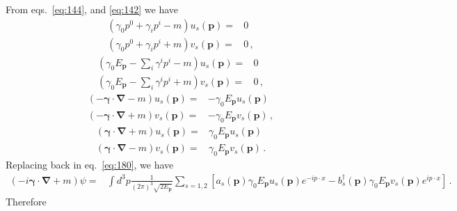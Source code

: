 From eqs.~\eqref{eq:144}, and \eqref{eq:142} we have
\begin{align}
  \left(\gamma_0 p^0+\gamma_i p^i-m\right)u_s(\mathbf{p})=&0\nonumber\\
  \left(\gamma_0 p^0+\gamma_i p^i+m\right)v_s(\mathbf{p})=&0\,,
\end{align}
\begin{align}
  \left(\gamma_0 E_{\mathbf{p}}-\sum_i\gamma^i p^i-m\right)u_s(\mathbf{p})=&0\nonumber\\
  \left(\gamma_0 E_{\mathbf{p}}-\sum_i\gamma^i p^i+m\right)v_s(\mathbf{p})=&0\,,
\end{align}
\begin{align}
  \left(-\boldsymbol{\gamma}\cdot\boldsymbol{\nabla}-m\right)u_s(\mathbf{p})=&-\gamma_0 E_{\mathbf{p}}u_s(\mathbf{p})\nonumber\\
  \left(-\boldsymbol{\gamma}\cdot\boldsymbol{\nabla}+m\right)v_s(\mathbf{p})=&-\gamma_0 E_{\mathbf{p}}v_s(\mathbf{p})\,,
\end{align}
\begin{align}
  \left(\boldsymbol{\gamma}\cdot\boldsymbol{\nabla}+m\right)u_s(\mathbf{p})=&\gamma_0 E_{\mathbf{p}}u_s(\mathbf{p})\nonumber\\
  \left(\boldsymbol{\gamma}\cdot\boldsymbol{\nabla}-m\right)v_s(\mathbf{p})=&\gamma_0 E_{\mathbf{p}}v_s(\mathbf{p})\,.
\end{align}
Replacing back in eq.~\eqref{eq:180}, we have
\begin{align}
 \left(-i\boldsymbol{\gamma}\cdot\boldsymbol{\nabla}+m\right)\psi=&\int d^3p\frac{1}{(2\pi)^3\sqrt{2 E_{\mathbf{p}}}}\sum_{s=1,2}\left[a_s(\mathbf{p})\gamma_0 E_{\mathbf{p}}u_s(\mathbf{p})e^{-i p\cdot x}
-b_s^\dagger(\mathbf{p})\gamma_0 E_{\mathbf{p}}v_s(\mathbf{p})e^{i p\cdot x}\right]\,.
\end{align}
Therefore
